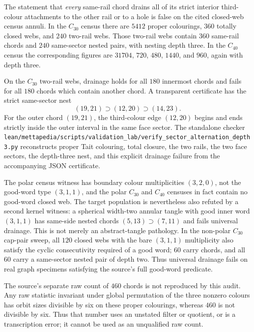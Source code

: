 \begin{proposition}
\label{prop:universal-chord-drainage-refuted-on-census}
The statement that \emph{every} same-rail chord drains all of its strict
interior third-colour attachments to the other rail or to a hole is false on
the cited closed-web census annuli.  In the $C_{30}$ census there are $5412$
proper colourings, $360$ totally closed webs, and $240$ two-rail webs.  Those
two-rail webs contain $360$ same-rail chords and $240$ same-sector nested
pairs, with nesting depth three.  In the $C_{40}$ census the corresponding
figures are $31704$, $720$, $480$, $1440$, and $960$, again with depth three.

On the $C_{30}$ two-rail webs, drainage holds for all $180$ innermost chords
and fails for all $180$ chords which contain another chord.  A transparent
certificate has the strict same-sector nest
\[
       (19,21)\supset(12,20)\supset(14,23).
\]
For the outer chord $(19,21)$, the third-colour edge $(12,20)$ begins and ends
strictly inside the outer interval in the same face sector.  The standalone
checker
\texttt{lean/mettapedia/scripts/validation\_lab/verify\_sector\_alternation\_depth3.py}
reconstructs proper Tait colouring, total closure, the two rails, the two
face sectors, the depth-three nest, and this explicit drainage failure from
the accompanying JSON certificate.

The polar census witness has boundary colour multiplicities $(3,2,0)$, not
the good-word type $(3,1,1)$, and the polar $C_{30}$ and $C_{40}$ censuses in
fact contain no good-word closed web.  The target population is nevertheless
also refuted by a second kernel witness: a spherical width-two annular tangle
with good inner word $(3,1,1)$ has same-side nested chords
$(5,13)\supset(7,11)$ and fails universal drainage.  This is not merely an
abstract-tangle pathology.  In the non-polar $C_{30}$ cap-pair sweep, all
$120$ closed webs with the bare $(3,1,1)$ multiplicity also satisfy the
cyclic consecutivity required of a good word; $60$ carry chords, and all $60$
carry a same-sector nested pair of depth two.  Thus universal drainage fails
on real graph specimens satisfying the source's full good-word predicate.

The source's separate raw count of $460$ chords is not reproduced by this
audit.  Any raw statistic invariant under global permutation of the three
nonzero colours has orbit sizes divisible by six on these proper colourings,
whereas $460$ is not divisible by six.  Thus that number uses an unstated
filter or quotient, or is a transcription error; it cannot be used as an
unqualified raw count.
\end{proposition}


